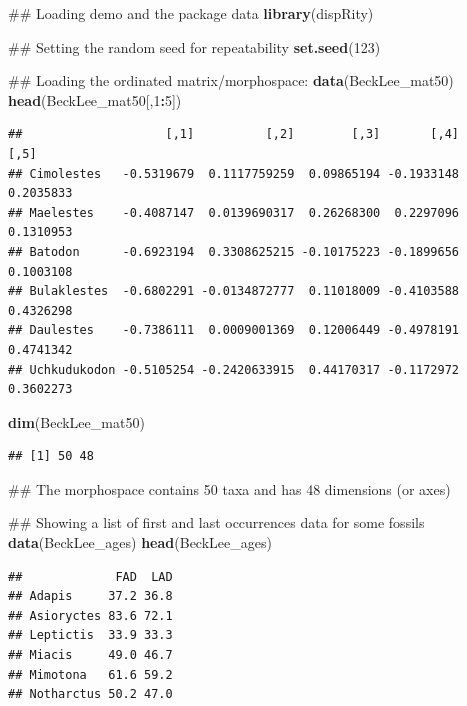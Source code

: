 \documentclass[]{book}
\newenvironment{Shaded}{\begin{snugshade}}{\end{snugshade}}
\newcommand{\KeywordTok}[1]{\textcolor[rgb]{0.13,0.29,0.53}{\textbf{#1}}}
\newcommand{\DecValTok}[1]{\textcolor[rgb]{0.00,0.00,0.81}{#1}}
\newcommand{\OperatorTok}[1]{\textcolor[rgb]{0.81,0.36,0.00}{\textbf{#1}}}
\newcommand{\NormalTok}[1]{#1}
\theoremstyle{definition}
\theoremstyle{definition}
\theoremstyle{definition}
\theoremstyle{remark}
\begin{document}
\begin{Shaded}
\begin{Highlighting}[]
\NormalTok{## Loading demo and the package data}
\KeywordTok{library}\NormalTok{(dispRity)}

\NormalTok{## Setting the random seed for repeatability}
\KeywordTok{set.seed}\NormalTok{(}\DecValTok{123}\NormalTok{)}

\NormalTok{## Loading the ordinated matrix/morphospace:}
\KeywordTok{data}\NormalTok{(BeckLee_mat50)}
\KeywordTok{head}\NormalTok{(BeckLee_mat50[,}\DecValTok{1}\OperatorTok{:}\DecValTok{5}\NormalTok{])}
\end{Highlighting}
\end{Shaded}

\begin{verbatim}
##                    [,1]          [,2]        [,3]       [,4]      [,5]
## Cimolestes   -0.5319679  0.1117759259  0.09865194 -0.1933148 0.2035833
## Maelestes    -0.4087147  0.0139690317  0.26268300  0.2297096 0.1310953
## Batodon      -0.6923194  0.3308625215 -0.10175223 -0.1899656 0.1003108
## Bulaklestes  -0.6802291 -0.0134872777  0.11018009 -0.4103588 0.4326298
## Daulestes    -0.7386111  0.0009001369  0.12006449 -0.4978191 0.4741342
## Uchkudukodon -0.5105254 -0.2420633915  0.44170317 -0.1172972 0.3602273
\end{verbatim}

\begin{Shaded}
\begin{Highlighting}[]
\KeywordTok{dim}\NormalTok{(BeckLee_mat50)}
\end{Highlighting}
\end{Shaded}

\begin{verbatim}
## [1] 50 48
\end{verbatim}

\begin{Shaded}
\begin{Highlighting}[]
\NormalTok{## The morphospace contains 50 taxa and has 48 dimensions (or axes)}

\NormalTok{## Showing a list of first and last occurrences data for some fossils}
\KeywordTok{data}\NormalTok{(BeckLee_ages)}
\KeywordTok{head}\NormalTok{(BeckLee_ages)}
\end{Highlighting}
\end{Shaded}

\begin{verbatim}
##             FAD  LAD
## Adapis     37.2 36.8
## Asioryctes 83.6 72.1
## Leptictis  33.9 33.3
## Miacis     49.0 46.7
## Mimotona   61.6 59.2
## Notharctus 50.2 47.0
\end{verbatim}
\end{document}
